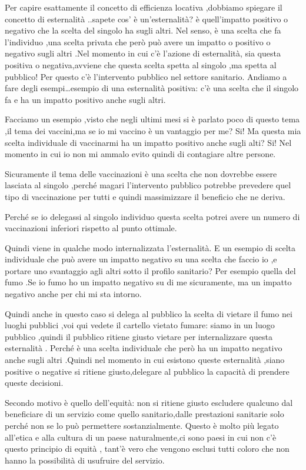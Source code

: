 \documentclass[]{article}
\begin{document}
Per capire esattamente il concetto di efficienza locativa ,dobbiamo
spiegare il concetto di esternalità ..sapete cos' è un'esternalità? è
quell'impatto positivo o negativo che la scelta del singolo ha sugli
altri. Nel senso, è una scelta che fa l'individuo ,una scelta privata
che però può avere un impatto o positivo o negativo sugli altri .Nel
momento in cui c'è l'azione di esternalità, sia questa positiva o
negativa,avviene che questa scelta spetta al singolo ,ma spetta al
pubblico! Per questo c'è l'intervento pubblico nel settore sanitario.
Andiamo a fare degli esempi\ldots{}esempio di una esternalità positiva:
c'è una scelta che il singolo fa e ha un impatto positivo anche sugli
altri.

Facciamo un esempio ,visto che negli ultimi mesi si è parlato poco di
questo tema ,il tema dei vaccini,ma se io mi vaccino è un vantaggio per
me? Si! Ma questa mia scelta individuale di vaccinarmi ha un impatto
positivo anche sugli alti? Si! Nel momento in cui io non mi ammalo evito
quindi di contagiare altre persone.

Sicuramente il tema delle vaccinazioni è una scelta che non dovrebbe
essere lasciata al singolo ,perché magari l'intervento pubblico potrebbe
prevedere quel tipo di vaccinazione per tutti e quindi massimizzare il
beneficio che ne deriva.

Perché se io delegassi al singolo individuo questa scelta potrei avere
un numero di vaccinazioni inferiori rispetto al punto ottimale.

Quindi viene in qualche modo internalizzata l'esternalità. E un esempio
di scelta individuale che può avere un impatto negativo su una scelta
che faccio io ,e portare uno svantaggio agli altri sotto il profilo
sanitario? Per esempio quella del fumo .Se io fumo ho un impatto
negativo su di me sicuramente, ma un impatto negativo anche per chi mi
sta intorno.

Quindi anche in questo caso si delega al pubblico la scelta di vietare
il fumo nei luoghi pubblici ,voi qui vedete il cartello vietato fumare:
siamo in un luogo pubblico ,quindi il pubblico ritiene giusto vietare
per internalizzare questa esternalità . Perché è una scelta individuale
che però ha un impatto negativo anche sugli altri .Quindi nel momento in
cui esistono queste esternalità ,siano positive o negative si ritiene
giusto,delegare al pubblico la capacità di prendere queste decisioni.

Secondo motivo è quello dell'equità: non si ritiene giusto escludere
qualcuno dal beneficiare di un servizio come quello sanitario,dalle
prestazioni sanitarie solo perché non se lo può permettere
sostanzialmente. Questo è molto più legato all'etica e alla cultura di
un paese naturalmente,ci sono paesi in cui non c'è questo principio di
equità , tant'è vero che vengono esclusi tutti coloro che non hanno la
possibilità di usufruire del servizio.
\end{document}
